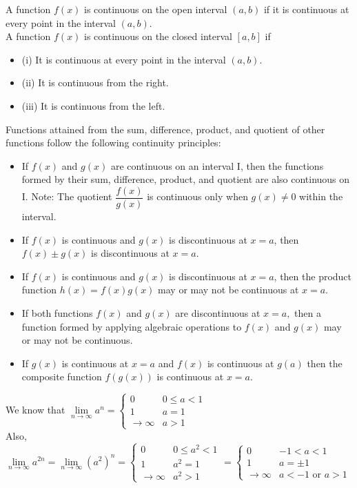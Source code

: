 \documentclass{article}
\newcommand{\theorem}[2]{\begin{tcolorbox}[title={#1},colback=blue!5!white,colframe=blue!75!black,parbox=false] #2 \end{tcolorbox}}
\begin{document}
\theorem{Continuity on Interval:}{
A function $f(x)$ is continuous on the open interval $(a,b)$ if it is continuous at every point in the interval $(a, b)$. \vspace{0.5em} \\
A function $f(x)$ is continuous on the closed interval $[a,b]$ if
\begin{itemize}
    \item (i) It is continuous at every point in the interval $(a,b)$.
    \item (ii) It is continuous from the right.
    \item (iii) It is continuous from the left.
\end{itemize}
}

Functions attained from the sum, difference, product, and quotient of other functions follow the following continuity principles:
\begin{itemize}
    \item If $f(x)$ and $g(x)$ are continuous on an interval I, then the functions formed by their sum, difference, product, and quotient are also continuous on I. Note: The quotient $\dfrac{f(x)}{g(x)}$ is continuous only when $g(x)\ne0$ within the interval. 
    \item If $f(x)$ is continuous and $g(x)$ is discontinuous at $x=a$, then $f(x)\pm g(x)$ is discontinuous at $x=a$. 
    \item If $f(x)$ is continuous and $g(x)$ is discontinuous at $x=a$, then the product function $h(x)=f(x)g(x)$ may or may not be continuous at $x=a.$ 
    \item If both functions $f(x)$ and $g(x)$ are discontinuous at $x=a,$ then a function formed by applying algebraic operations to $f(x)$ and $g(x)$ may or may not be continuous. 
    \item If $g(x)$ is continuous at $x=a$ and $f(x)$ is continuous at $g(a)$ then the composite function $f(g(x))$ is continuous at $x=a.$ 
\end{itemize}

\theorem{Continuity of Function Involving Limit at Infinity}{We know that $\lim\limits_{n \to \infty} a^n =
\begin{cases}
0 & 0 \le a < 1 \\
1 & a = 1 \\
\to \infty & a > 1
\end{cases}$\\
Also, $\lim\limits_{n \to \infty} a^{2n}
= \lim\limits_{n \to \infty} (a^2)^n
=
\begin{cases}
0 & 0 \le a^2 < 1 \\
1 & a^2 = 1 \\
\to \infty & a^2 > 1
\end{cases}
=
\begin{cases}
0 & -1 < a < 1 \\
1 & a = \pm 1 \\
\to \infty & a < -1 \text{ or } a > 1
\end{cases}$
}
\end{document}
